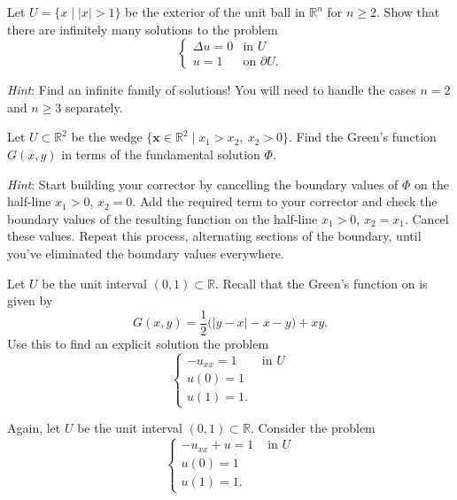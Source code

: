 \documentclass[12pt,fleqn]{exam}
\newcommand{\R}{\ensuremath{\mathbb{R}}}
\begin{document}
\begin{questions}

\question Let $U = \{x \mid |x| > 1\}$ be the exterior of the unit ball in $\R^n$ for $n \geq 2$. Show that there are infinitely many solutions to the problem
\[\begin{cases}
\Delta u = 0 & \text{in } U \\
u = 1 & \text{on } \partial U .
\end{cases}\]

\emph{Hint}: Find an infinite family of solutions! You will need to handle the cases $n = 2$ and $n \geq 3$ separately.

\question Let $U \subset \R^2$ be the wedge $\{\mathbf{x} \in \mathbb{R}^2 \mid x_1 > x_2,\ x_2 > 0\}$. Find the Green's function $G(x,y)$ in terms of the fundamental solution $\Phi$.

\vspace{1ex}\emph{Hint}: Start building your corrector by cancelling the boundary values of $\Phi$ on the half-line $x_1 > 0$, $x_2 = 0$. Add the required term to your corrector and check the boundary values of the resulting function on the half-line $x_1 > 0$, $x_2 = x_1$. Cancel these values. Repeat this process, alternating sections of the boundary, until you've eliminated the boundary values everywhere.

\question Let $U$ be the unit interval $(0,1) \subset \R$. Recall that the Green's function on is given by
\[G(x,y) = \frac12 \big(|y-x|-x-y\big) + xy.\]
Use this to find an explicit solution the problem
\[
\begin{cases}
-u_{xx} = 1 & \text{ in $U$} \\
u(0) = 1 \\
u(1) = 1.
\end{cases}
\]

\question Again, let $U$ be the unit interval $(0,1) \subset \R$. Consider the problem
\[
\begin{cases}
-u_{xx} + u = 1 & \text{ in $U$} \\
u(0) = 1 \\
u(1) = 1.
\end{cases}
\]



\end{questions}
\end{document}
